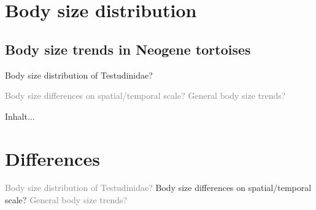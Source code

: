 \section{Body size distribution}


\subsection{Body size trends in Neogene tortoises}

\begin{frame}
\begin{enumerate}
\p Body size distribution of Testudinidae?
\bigskip

\p \textcolor{gray}{
 Body size differences on spatial/temporal scale? 
\bigskip
\p General body size trends? }
\end{enumerate}
\end{frame}


\begin{frame}
Inhalt...
\end{frame}




\section{Differences}


\begin{frame}
\begin{enumerate}
	
	\p \textcolor{gray}{Body size distribution of Testudinidae?}
	\bigskip
	\p Body size differences on spatial/temporal scale?
	\bigskip
	\p \textcolor{gray}{General body size trends?}
\end{enumerate}
\end{frame}









